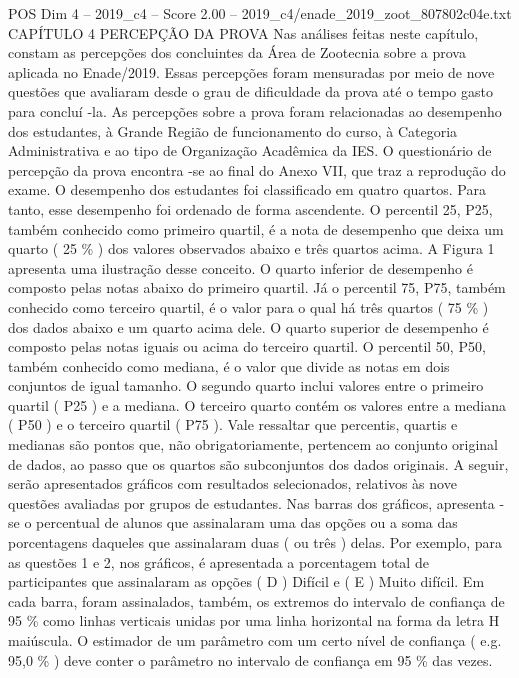 \begin{textsample}{POS Dim 4 – 2019\_c4 – Score 2.00 – 2019\_c4/enade\_2019\_zoot\_807802c04e.txt}  \label{ex:f4_pos_120}
CAPÍTULO 4 PERCEPÇÃO DA PROVA Nas análises feitas neste capítulo, constam as percepções dos concluintes da Área de Zootecnia sobre a prova aplicada no Enade/2019.
Essas percepções foram mensuradas por meio de nove questões que avaliaram desde o grau de dificuldade da prova até o tempo gasto para concluí -la.
As percepções sobre a prova foram relacionadas ao desempenho dos estudantes, à Grande Região de funcionamento do curso, à Categoria Administrativa e ao tipo de Organização Acadêmica da IES.
O questionário de percepção da prova encontra -se ao final do Anexo VII, que traz a reprodução do exame.
O desempenho dos estudantes foi classificado em quatro quartos.
Para tanto, esse desempenho foi ordenado de forma ascendente.
O percentil 25, P25, também conhecido como primeiro quartil, é a nota de desempenho que deixa um quarto ( 25 \% ) dos valores observados abaixo e três quartos acima.
A Figura 1 apresenta uma ilustração desse conceito.
O quarto inferior de desempenho é composto pelas notas abaixo do primeiro quartil.
Já o percentil 75, P75, também conhecido como terceiro quartil, é o valor para o qual há três quartos ( 75 \% ) dos dados abaixo e um quarto acima dele.
O quarto superior de desempenho é composto pelas notas iguais ou acima do terceiro quartil.
O percentil 50, P50, também conhecido como mediana, é o valor que divide as notas em dois conjuntos de igual tamanho.
O segundo quarto inclui valores entre o primeiro quartil ( P25 ) e a mediana.
O terceiro quarto contém os valores entre a mediana ( P50 ) e o terceiro quartil ( P75 ).
Vale ressaltar que percentis, quartis e medianas são pontos que, não obrigatoriamente, pertencem ao conjunto original de dados, ao passo que os quartos são subconjuntos dos dados originais.
A seguir, serão apresentados gráficos com resultados selecionados, relativos às nove questões avaliadas por grupos de estudantes.
Nas barras dos gráficos, apresenta -se o percentual de alunos que assinalaram uma das opções ou a soma das porcentagens daqueles que assinalaram duas ( ou três ) delas.
Por exemplo, para as questões 1 e 2, nos gráficos, é apresentada a porcentagem total de participantes que assinalaram as opções ( D ) Difícil e ( E ) Muito difícil.
Em cada barra, foram assinalados, também, os extremos do intervalo de confiança de 95 \% como linhas verticais unidas por uma linha horizontal na forma da letra H maiúscula.
O estimador de um parâmetro com um certo nível de confiança ( e.g. 95,0 \% ) deve conter o parâmetro no intervalo de confiança em 95 \% das vezes.

\end{textsample}
